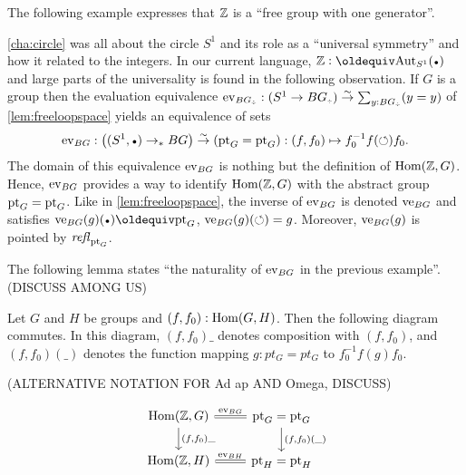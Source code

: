 \begin{example}
\end{example}

The following example expresses that $\mathbb{Z}$ is a ``free group with one generator''.

\begin{example}
  \label{ex:Zinitial}
  \cref{cha:circle} was all about the circle $S^1$ and its role as a
  ``universal symmetry'' and how it related to the integers.  In our
  current language, $\ZZ\defequi\aut_{S^1}(\base)$ and large parts of
  the universality is found in the following observation.  If $G$ is a
  group then the evaluation equivalence
  $\ev_{BG_\div}:(S^1\to BG_\div)\we \sum_{y:BG_\div}(y=y)$ of
  \cref{lem:freeloopspace} yields an equivalence of sets
  $$\ev_{BG}:\left((S^1,\base)\ptdto BG\right)\we (\pt_G=\pt_G)
            : (f,f_0)\mapsto f_0^{-1}f(\Sloop)f_0.$$
  The domain of this equivalence $\mathrm{ev}_{BG}$ is nothing but the
  definition of $\mathrm{Hom}(\mathbb{Z},G)$. Hence, $\mathrm{ev}_{BG}$ provides a way to
  identify $\mathrm{Hom}(\mathbb{Z},G)$ with the abstract group $\mathrm{pt}_G=\mathrm{pt}_G$.
Like in \cref{lem:freeloopspace}, the inverse of $\mathrm{ev}_{BG}$
is denoted $\mathrm{ve}_{BG}$ and satisfies $\ve_{BG}(g)(\base)\jdeq\pt_G$, 
$\mathrm{ve}_{BG}(g)(\circlearrowleft)= g$. Moreover, $\mathrm{ve}_{BG}(g)$ is pointed by $\mathop{\mathit{refl}_{\mathrm{pt}_G}}$.
\end{example}

The following lemma states ``the naturality of $\mathrm{ev}_{BG}$ in the previous example''.
(DISCUSS AMONG US)

\begin{lemma}\label{lem:Znatural}
Let $G$ and $H$ be groups and $(f,f_0): \mathrm{Hom}(G,H)$.
Then the following diagram commutes. In this diagram,
$(f,f_0)\_$ denotes composition with $(f,f_0)$, and 
$(f,f_0)(\_)$ denotes the function mapping $g:pt_G = pt_G$ to $f_0^{-1} f(g) f_0$.
\end{lemma}
(ALTERNATIVE NOTATION FOR Ad ap AND Omega, DISCUSS)

\[
\begin{tikzcd} 
\Hom(\ZZ,G) \arrow[r, equal, "\ev_{BG}"] \arrow[d, "{(f,f_0)\_}"] & 
\pt_G = \pt_G \arrow[d, "{(f,f_0)(\_)}"]\\ 
\Hom(\ZZ,H) \arrow[r, equal, "\ev_{BH}"] & \pt_H = \pt_H \\
\end{tikzcd}
\]

